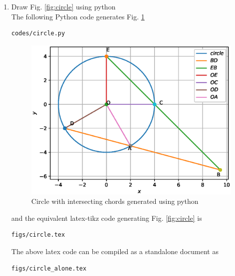 \begin{enumerate}[label=\thesection.\arabic*.,ref=\thesection.\theenumi]
\begin{table}[ht!]

\caption{Derived coordinates}
\label{table:table2}	
\end{table}
\item Draw Fig. \ref{fig:circle} using python	
\\
\solution The  following Python code generates Fig. \ref{fig:circle_py}
%
\begin{lstlisting}
codes/circle.py
\end{lstlisting}
\begin{figure}[!ht]
\centering
\includegraphics[width=\columnwidth]{./codes/pyfigs/circle.eps}
\caption{Circle with intersecting chords generated using python}
\label{fig:circle_py}
\end{figure}

%
and the equivalent latex-tikz code generating Fig. \ref{fig:circle} is 
\begin{lstlisting}
figs/circle.tex
\end{lstlisting}
%
The above latex code can be compiled as a standalone document as
\begin{lstlisting}
figs/circle_alone.tex
\end{lstlisting}

%

\end{enumerate}
